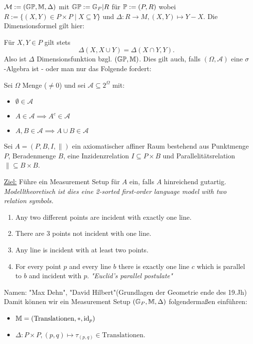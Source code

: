 \begin{beispiel}
    $\mathcal{M} := (\G\P, \M, \Delta)$ mit $\G\P := \G_P|R$ für $\P:=(P,R)$ wobei $R := \{(X,Y) \in P\times P \mid X \subseteq Y\}$
    und $\Delta: R \to M, (X,Y) \mapsto Y-X$.\nl
    Die Dimensionsformel gilt hier:

    Für $X,Y \in P$ gilt stets $$\Delta(X,X\cup Y) = \Delta(X\cap Y,Y).$$
    Also ist $\Delta$ Dimensionsfunktion bzgl. $(\G\P,\M)$.\nl
    Dies gilt auch, falls $(\Omega, \mathcal{A})$ eine $\sigma$-Algebra ist - 
    oder man nur das Folgende fordert:

    Sei $\Omega$ Menge ($\ne 0$) und sei $\mathcal{A} \subseteq 2^\Omega$ mit:
    \begin{itemize}
        \item $\emptyset\in \mathcal{A}$
        \item $A \in \mathcal{A} \implies A^c \in \mathcal{A}$
        \item $A,B \in \mathcal{A} \implies A \cup B \in \mathcal{A}$
    \end{itemize}
\end{beispiel}

\begin{beispiel}
    Sei $A = (P,B,I, \parallel)$ ein axiomatischer affiner Raum bestehend aus Punktmenge $P$, Beradenmenge $B$, eine 
    Inzidenzrelation $I \subseteq P\times B$ und Parallelitätsrelation $\parallel \subseteq B \times B$.

    \underline{Ziel:} Führe ein Measurement Setup für $A$ ein, falls $A$ hinreichend gutartig.
    \textit{Modelltheoretisch ist dies eine 2-sorted first-order language model with two relation symbols.}

    \begin{enumerate}[label=(Axiom \arabic{*})]
        \item Any two different points are incident with exactly one line.
        \item There are 3 points not incident with one line.
        \item Any line is incident with at least two points.
        \item For every point $p$ and every line $b$ there is exactly one line $c$ which is parallel to $b$ and incident with $p$.
        \textit{"Euclid's parallel postulate"}
    \end{enumerate}

    Namen: "Max Dehn", "David Hilbert"(Grundlagen der Geometrie ende des 19.Jh)\nl
    Damit können wir ein Measurement Setup $(\G_P, \M, \Delta)$ folgendermaßen einführen:
    \begin{itemize}
        \item $\M = (\text{Translationen}, \ast, \id_p)$
        \item $\Delta: P\times P, (p,q) \mapsto \tau_{(p,q)} \in \text{Translationen}$.
    \end{itemize}
\end{beispiel}